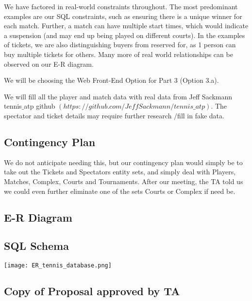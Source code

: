\documentclass[11pt]{article}
\begin{document}
\begin{enumerate}
We have factored in real-world constraints throughout. The most predominant examples are our SQL constraints, such as ensuring there is a unique winner for each match. Further, a match can have multiple start times, which would indicate a suspension (and may end up being played on different courts). In the examples of tickets, we are also distinguishing buyers from reserved for, as 1 person can buy multiple tickets for others. Many more of real world relationships can be observed on our E-R diagram.

We will be choosing the Web Front-End Option for Part 3 (Option 3.a).

We will fill all the player and match data with real data from Jeff Sackmann tennis$\_$atp github $(https://github.com/JeffSackmann/tennis\_atp)$. The spectator and ticket details may require further research $/$fill in fake data.
\end{enumerate}


\subsection*{Contingency Plan}
We do not anticipate needing this, but our contingency plan would simply be to take out the Tickets and Spectators entity sets, and simply deal with Players, Matches, Complex, Courts and Tournaments. After our meeting, the TA told us we could even further eliminate one of the sets Courts or Complex if need be.

\subsection*{E-R Diagram}
\subsection*{SQL Schema}

\newpage

\texttt{[image: ER\_tennis\_database.png]}

\newpage


\newpage
\subsection*{Copy of Proposal approved by TA}
\begin{mdframed}
\end{mdframed}


\end{document}
